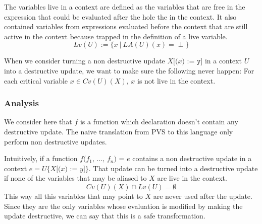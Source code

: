 \documentclass[12pt,a4paper]{article}
\newcommand{\cl}[1]{\texttt{#1}}
\newcommand{\ucont}[1]{\{#1\}}
\begin{document}
The variables live in a context are defined as the variables that are free in the expression that could be evaluated after the hole the in the context. It also contained variables from expressions evaluated before the context that are still active in the context because trapped in the definition of a live variable.
$$ Lv(U) := \{ x \ | \ LA(U)(x) = \perp \} $$


When we consider turning a non destructive update $X\cl{[(}x\cl{) := } \cl{y} \cl{]}$ in a context $U$ into a destructive update, we want to make sure the following never happen:
For each critical variable $x \in Cv(U)(X)$, $x$ is not live in the context.






\subsubsection{Analysis}

We consider here that $f$ is a function which declaration doesn't contain any destructive update. The naive translation from PVS to this language only perform non destructive updates.

Intuitively, if a function $f\cl{(}f_1\cl{, } ... \cl{, } f_n\cl{) = } e$ contains a non destructive update in a context $e = U\ucont{X\cl{[(}x\cl{) := }y\cl{]}}$. That update can be turned into a destructive update if none of the variables that may be aliased to $X$ are live in the context.
$$ Cv(U)(X) \cap Lv(U) = \emptyset $$
This way all this variables that may point to $X$ are never used after the update. Since they are the only variables whose evaluation is modified by making the update destructive, we can say that this is a safe transformation.\\
\end{document}
